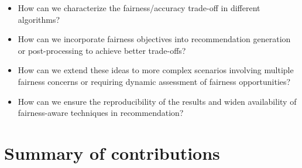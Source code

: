 \begin{itemize}
    \item How can we characterize the fairness/accuracy trade-off in different algorithms?
    \item How can we incorporate fairness objectives into recommendation generation or post-processing to achieve better trade-offs? %
    \item How can we extend these ideas to more complex scenarios involving multiple fairness concerns or requiring dynamic assessment of fairness opportunities? %
    \item How can we ensure the reproducibility of the results and widen availability of fairness-aware techniques in recommendation? %
\end{itemize}

\section{Summary of contributions}













